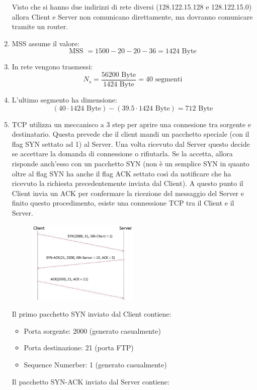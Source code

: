 \documentclass[10pt]{article}
\begin{document}
\begin{enumerate}
		Visto che si hanno due indirizzi di rete diversi (128.122.15.128 e 128.122.15.0) allora Client e Server non comunicano direttamente, ma dovranno comunicare tramite un router.
		\item MSS assume il valore: $$\textrm{MSS } = 1500 - 20 - 20 - 36 = 1424 \textrm{ Byte}$$
		\item In rete vengono trasmessi:
		$$ N_{s} =  \frac{56200 \textrm{ Byte}}{1424 \textrm{ Byte}} = 40 \textrm{ segmenti}$$
		\item L'ultimo segmento ha dimensione: $$(40 \cdot 1424 \textrm{ Byte}) - (39.5 \cdot 1424 \textrm{ Byte}) = 712 \textrm{ Byte}$$
		\newpage
		\item TCP utilizza un meccanisco a 3 step per aprire una connesione tra sorgente e destinatario. Questa prevede che il client mandi un pacchetto speciale (con il flag SYN settato ad 1) al Server. Una volta ricevuto dal Server questo decide se accettare la domanda di connessione o rifiutarla. 
		Se la accetta, allora risponde anch'esso con un pacchetto SYN (non è un semplice SYN in quanto oltre al flag SYN ha anche il flag ACK settato così da notificare che ha ricevuto la richiesta precedentemente inviata dal Client). A questo punto il Client invia un ACK per confermare la ricezione 
		del messaggio del Server e finito questo procedimento, esiste una connessione TCP tra il Client e il Server.
		\begin{figure}[H]
			\centering
			\includegraphics[width=0.5\textwidth]{ConnectionSetup_12062019}
		\end{figure}
		Il primo pacchetto SYN inviato dal Client contiene:
		\begin{itemize}
			\item Porta sorgente: 2000 (generato casualmente)
			\item Porta destinazione: 21 (porta FTP)
			\item Sequence Numerber: 1 (generato casualmente)
		\end{itemize}
		Il pacchetto SYN-ACK inviato dal Server contiene:
		\begin{itemize}

\end{itemize}
\end{enumerate}
\end{document}
